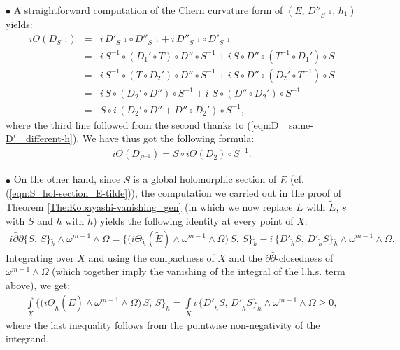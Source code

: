 \documentclass[12pt]{article}
\begin{document}
$\bullet$ A straightforward computation of the Chern curvature form of $(E,\,D''_{S^{-1}},\,h_1)$ yields: \begin{eqnarray*}i\Theta(D_{S^{-1}}) & = & i\,D'_{S^{-1}}\circ D''_{S^{-1}} + i\,D''_{S^{-1}}\circ D'_{S^{-1}} \\
  & = & i\,S^{-1}\circ (D_1'\circ T)\circ D''\circ S^{-1} + i\,S\circ D''\circ (T^{-1} \circ D_1')\circ S \\
  & = & i\,S^{-1}\circ (T\circ D_2')\circ D''\circ S^{-1} + i\,S\circ D''\circ (D_2'\circ T^{-1})\circ S \\
  & = & i\,S\circ(D_2'\circ D'')\circ S^{-1} + i\,\,S\circ(D''\circ D_2')\circ S^{-1} \\
  & = & S\circ i\,(D_2'\circ D'' + D''\circ D_2')\circ S^{-1},\end{eqnarray*} where the third line followed from the second thanks to (\ref{eqn:D'_same-D''_different-h}). We have thus got the following formula: \begin{eqnarray}\label{eqn:curvature_D_S-1_D_2}i\Theta(D_{S^{-1}}) = S\circ i\Theta(D_2)\circ S^{-1}.\end{eqnarray}

$\bullet$ On the other hand, since $S$ is a global holomorphic section of $\widetilde{E}$ (cf. (\ref{eqn:S_hol-section_E-tilde})), the computation we carried out in the proof of Theorem \ref{The:Kobayashi-vanishing_gen} (in which we now replace $E$ with $\widetilde{E}$, $s$ with $S$ and $h$ with $\widetilde{h}$) yields the following identity at every point of $X$: \begin{eqnarray}\label{eqn:dd-bar_S-S_curvature_Bochner_pointwise}i\bar\partial\partial\{S,\,S\}_{\widetilde{h}}\wedge\omega^{m-1}\wedge\Omega  =  \bigg\{\bigg(i\Theta_{\widetilde{h}}(\widetilde{E})\wedge\omega^{m-1}\wedge\Omega\bigg)\,S,\,S\bigg\}_{\widetilde{h}} - i\,\{D'_{\widetilde{h}}S,\,D'_{\widetilde{h}}S\}_{\widetilde{h}}\wedge\omega^{m-1}\wedge\Omega.\end{eqnarray} Integrating over $X$ and using the compactness of $X$ and the $\partial\bar\partial$-closedness of $\omega^{m-1}\wedge\Omega$ (which together imply the vanishing of the integral of the l.h.s. term above), we get: \begin{eqnarray}\label{eqn:dd-bar_S-S_curvature_Bochner_integrated}\int\limits_X\bigg\{\bigg(i\Theta_{\widetilde{h}}(\widetilde{E})\wedge\omega^{m-1}\wedge\Omega\bigg)\,S,\,S\bigg\}_{\widetilde{h}} = \int\limits_X  i\,\{D'_{\widetilde{h}}S,\,D'_{\widetilde{h}}S\}_{\widetilde{h}}\wedge\omega^{m-1}\wedge\Omega\geq 0,\end{eqnarray} where the last inequality follows from the pointwise non-negativity of the integrand.
\end{document}
